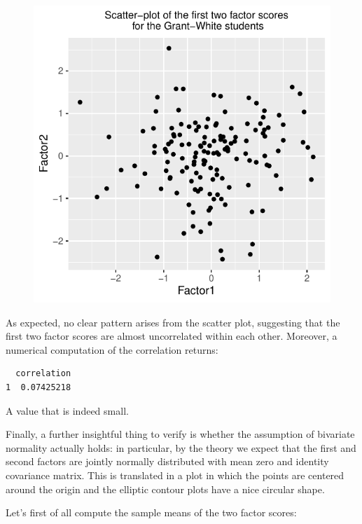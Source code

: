 \documentclass[
  letterpaper,
  DIV=11,
  numbers=noendperiod]{scrartcl}
\begin{document}
\begin{figure}[H]

{\centering \includegraphics{ProblemSet2_files/figure-pdf/unnamed-chunk-35-1.pdf}

}

\end{figure}

As expected, no clear pattern arises from the scatter plot, suggesting
that the first two factor scores are almost uncorrelated within each
other. Moreover, a numerical computation of the correlation returns:

\begin{verbatim}
  correlation
1  0.07425218
\end{verbatim}

A value that is indeed small.

Finally, a further insightful thing to verify is whether the assumption
of bivariate normality actually holds: in particular, by the theory we
expect that the first and second factors are jointly normally
distributed with mean zero and identity covariance matrix. This is
translated in a plot in which the points are centered around the origin
and the elliptic contour plots have a nice circular shape.

Let's first of all compute the sample means of the two factor scores:
\end{document}
